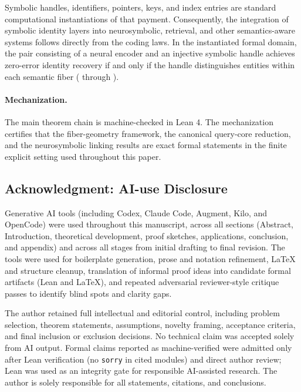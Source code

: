 Symbolic handles, identifiers, pointers, keys, and index entries are standard computational instantiations of that payment. Consequently, the integration of symbolic identity layers into neurosymbolic, retrieval, and other semantics-aware systems follows directly from the coding laws. In the instantiated formal domain, the pair consisting of a neural encoder and an injective symbolic handle achieves zero-error identity recovery if and only if the handle distinguishes entities within each semantic fiber ( through ).

\paragraph{Mechanization.}
The main theorem chain is machine-checked in Lean 4. The mechanization certifies that the fiber-geometry framework, the canonical query-core reduction, and the neurosymbolic linking results are exact formal statements in the finite explicit setting used throughout this paper.

\subsection*{Acknowledgment: AI-use Disclosure}

Generative AI tools (including Codex, Claude Code, Augment, Kilo, and OpenCode) were used throughout this manuscript, across all sections (Abstract, Introduction, theoretical development, proof sketches, applications, conclusion, and appendix) and across all stages from initial drafting to final revision. The tools were used for boilerplate generation, prose and notation refinement, LaTeX and structure cleanup, translation of informal proof ideas into candidate formal artifacts (Lean and LaTeX), and repeated adversarial reviewer-style critique passes to identify blind spots and clarity gaps.

The author retained full intellectual and editorial control, including problem selection, theorem statements, assumptions, novelty framing, acceptance criteria, and final inclusion or exclusion decisions. No technical claim was accepted solely from AI output. Formal claims reported as machine-verified were admitted only after Lean verification (no \texttt{sorry} in cited modules) and direct author review; Lean was used as an integrity gate for responsible AI-assisted research. The author is solely responsible for all statements, citations, and conclusions.
